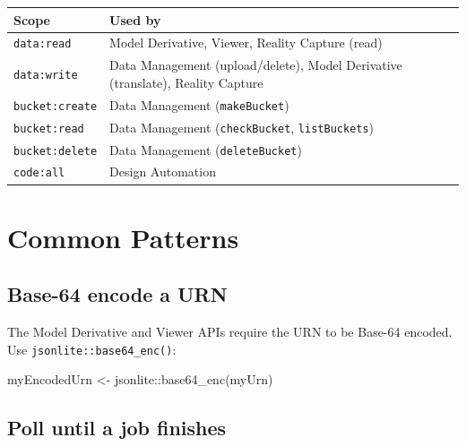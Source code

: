 \documentclass[
  11pt,
  letterpaper,
  DIV=11,
  numbers=noendperiod]{scrreprt}
\newenvironment{Shaded}{\begin{snugshade}}{\end{snugshade}}
\newcommand{\FunctionTok}[1]{\textcolor[rgb]{0.28,0.35,0.67}{#1}}
\newcommand{\NormalTok}[1]{\textcolor[rgb]{0.00,0.23,0.31}{#1}}
\newcommand{\OtherTok}[1]{\textcolor[rgb]{0.00,0.23,0.31}{#1}}
\newcommand{\SpecialCharTok}[1]{\textcolor[rgb]{0.37,0.37,0.37}{#1}}
\begin{document}
\begin{longtable}[]{@{}
  >{\raggedright\arraybackslash}p{}
  >{\raggedright\arraybackslash}p{}@{}}
\toprule\noalign{}
\begin{minipage}[b]{\linewidth}\raggedright
Scope
\end{minipage} & \begin{minipage}[b]{\linewidth}\raggedright
Used by
\end{minipage} \\
\midrule\noalign{}
\endhead
\bottomrule\noalign{}
\endlastfoot
\texttt{data:read} & Model Derivative, Viewer, Reality Capture (read) \\
\texttt{data:write} & Data Management (upload/delete), Model Derivative
(translate), Reality Capture \\
\texttt{bucket:create} & Data Management (\texttt{makeBucket}) \\
\texttt{bucket:read} & Data Management (\texttt{checkBucket},
\texttt{listBuckets}) \\
\texttt{bucket:delete} & Data Management (\texttt{deleteBucket}) \\
\texttt{code:all} & Design Automation \\
\end{longtable}

\section{Common Patterns}\label{common-patterns}

\subsection{Base-64 encode a URN}\label{base-64-encode-a-urn}

The Model Derivative and Viewer APIs require the URN to be Base-64
encoded. Use \texttt{jsonlite::base64\_enc()}:

\begin{Shaded}
\begin{Highlighting}[]
\NormalTok{myEncodedUrn }\OtherTok{\textless{}{-}}\NormalTok{ jsonlite}\SpecialCharTok{::}\FunctionTok{base64\_enc}\NormalTok{(myUrn)}
\end{Highlighting}
\end{Shaded}

\subsection{Poll until a job finishes}\label{poll-until-a-job-finishes}
\end{document}
